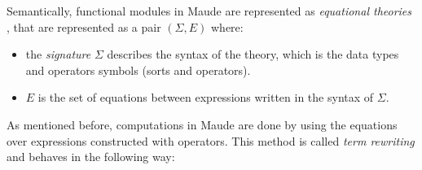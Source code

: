 Semantically, functional modules in Maude are represented as \textit{equational theories} \cite{Lecture1,PeterMaude}, that are represented as a pair $(\Sigma, E)$ where: 
\begin{itemize}
    \item the \textit{signature} $\Sigma$ describes the syntax of the theory, which is the data types and operators symbols (sorts and operators).
    \item $E$ is the set of equations between expressions written in the syntax of $\Sigma$.
\end{itemize}
As mentioned before, computations in Maude are done by using the equations over expressions constructed with operators. This method is called \textit{term rewriting} \cite{Lecture1,PeterMaude} and behaves in the following way: 

